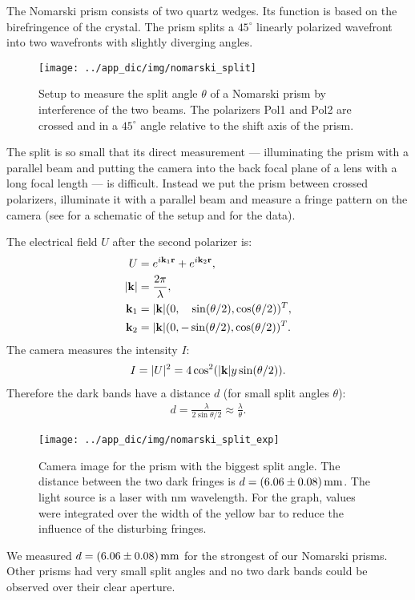 The Nomarski prism consists of two quartz wedges. Its function is
based on the birefringence of the crystal. The prism splits a
$45^\circ$ linearly polarized wavefront into two wavefronts with
slightly diverging angles.
\begin{figure}[htb]
  \centering
  \texttt{[image: ../app\_dic/img/nomarski\_split]}
  \caption{Setup to measure the split angle $\theta$ of a Nomarski
    prism by interference of the two beams. The polarizers Pol1 and
    Pol2 are crossed and in a $45^\circ$ angle relative to the shift
    axis of the prism.}
  \label{fig:nomarski_split}
\end{figure}
The split is so small that its direct measurement --- illuminating the
prism with a parallel beam and putting the camera into the back focal
plane of a lens with a long focal length --- is difficult.  Instead we
put the prism between crossed polarizers, illuminate it with a
parallel beam and measure a fringe pattern on the camera (see
 for a schematic of the setup and
 for the data).

The electrical field $U$ after the second polarizer is:
\begin{align}
  U&=e^{i\mathbf{k}_1\mathbf{r}}+e^{i\mathbf{k}_2\mathbf{r}},\\
  \mathopen| \mathbf{k} \mathclose|&=\frac{2\pi}{\lambda},\\
  \mathbf{k}_1&=\mathopen| \mathbf{k} \mathclose|(0, \hspace{1em}\sin(\theta/2), \cos(\theta/2))^T,\\
  \mathbf{k}_2&=\mathopen| \mathbf{k} \mathclose|(0, -\sin(\theta/2), \cos(\theta/2))^T.
\end{align}
The camera measures the intensity $I$:
\begin{align}
  I=\mathopen| U \mathclose|^2=4\cos^2(\mathopen| \mathbf{k} \mathclose|y\sin(\theta/2)).
\end{align}
Therefore the dark bands have a distance $d$ (for small split angles
$\theta$):
\begin{align}
  d=\frac{\lambda}{2\sin{\theta/2}}\approx \frac{\lambda}{\theta}.
\end{align}
\begin{figure}[htb]
  \centering
  \texttt{[image: ../app\_dic/img/nomarski\_split\_exp]}
  \caption{Camera image for the prism with the biggest split
    angle. The distance between the two dark fringes is
    $d=\unit[(6.06\pm0.08)]{mm}$. The light source is a laser with
    \unit[473]{nm} wavelength. For the graph, values were integrated
    over the width of the yellow bar to reduce the influence of the
    disturbing fringes.}
  \label{fig:nomarski_split_exp}
\end{figure}
We measured $d=\unit[(6.06\pm0.08)]{mm}$ for the strongest of our
Nomarski prisms.  Other prisms had very small split angles and no two
dark bands could be observed over their clear aperture.

